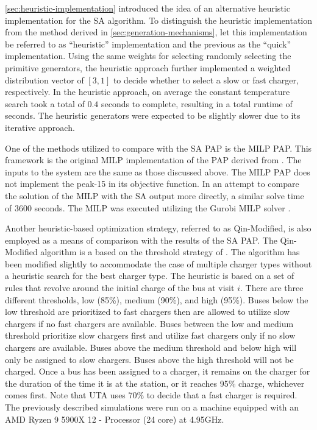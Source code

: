 \documentclass[ee,thesis]{usuthesis}
\newcommand{\tempcnt}{9101 }                                                    %
\newcommand{\heuristiclocal}{0.4 }                                             %
\begin{document}
\ref{sec:heuristic-implementation} introduced the idea of an alternative heuristic implementation for the SA algorithm. To
distinguish the heuristic implementation from the method derived in \ref{sec:generation-mechanisms}, let this implementation
be referred to as ``heuristic'' implementation and the previous as the ``quick'' implementation. Using the same weights for
selecting randomly selecting the primitive generators, the heuristic approach further implemented a weighted
distribution vector of \([3, 1]\) to decide whether to select a slow or fast charger, respectively. In the heuristic
approach, on average the constant temperature search took a total of \(\heuristiclocal\) seconds to complete, resulting in
a total runtime of \fpeval{\heuristiclocal * \tempcnt} seconds. The heuristic generators were expected to be
slightly slower due to its iterative approach.

One of the methods utilized to compare with the SA PAP is the MILP PAP. This framework is the original MILP
implementation of the PAP derived from \cite{qarebagh-2019-optim-sched}. The inputs to the system are the same as those
discussed above. The MILP PAP does not implement the peak-15 in its objective function. In an attempt to compare the
solution of the MILP with the SA output more directly, a similar solve time of 3600 seconds. The MILP was executed
utilizing the Gurobi MILP solver \cite{gurobi-2021-gurob-optim}.

Another heuristic-based optimization strategy, referred to as Qin-Modified, is also employed as a means of comparison
with the results of the SA PAP. The Qin-Modified algorithm is a based on the threshold strategy of
\cite{qin-2016-numer-analy}. The algorithm has been modified slightly to accommodate the case of multiple charger types
without a heuristic search for the best charger type. The heuristic is based on a set of rules that revolve around the
initial charge of the bus at visit \(i\). There are three different thresholds, low (85\%), medium (90\%), and high (95\%).
Buses below the low threshold are prioritized to fast chargers then are allowed to utilize slow chargers if no fast
chargers are available. Buses between the low and medium threshold prioritize slow chargers first and utilize fast
chargers only if no slow chargers are available. Buses above the medium threshold and below high will only be assigned
to slow chargers. Buses above the high threshold will not be charged. Once a bus has been assigned to a charger, it
remains on the charger for the duration of the time it is at the station, or it reaches 95\% charge, whichever comes
first. Note that UTA uses 70\% to decide that a fast charger is required. The previously described simulations were run
on a machine equipped with an AMD Ryzen 9 5900X 12 - Processor (24 core) at 4.95GHz.
\end{document}
